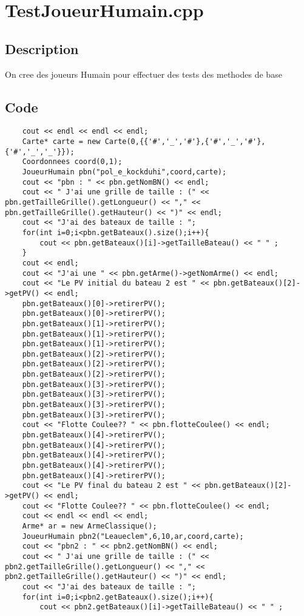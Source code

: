     \section{TestJoueurHumain.cpp}
        \subsection{Description}
            On cree des joueurs Humain pour effectuer des tests des methodes de base
        \subsection{Code}
\begin{lstlisting}
	cout << endl << endl << endl;
	Carte* carte = new Carte(0,{{'#','_','#'},{'#','_','#'},{'#','_','_'}});
	Coordonnees coord(0,1);
	JoueurHumain pbn("pol_e_kockduhi",coord,carte);
	cout << "pbn : " << pbn.getNomBN() << endl;
	cout << " J'ai une grille de taille : (" << pbn.getTailleGrille().getLongueur() << "," << pbn.getTailleGrille().getHauteur() << ")" << endl;
	cout << "J'ai des bateaux de taille : ";
	for(int i=0;i<pbn.getBateaux().size();i++){
		cout << pbn.getBateaux()[i]->getTailleBateau() << " " ;
	}
	cout << endl;
	cout << "J'ai une " << pbn.getArme()->getNomArme() << endl;
	cout << "Le PV initial du bateau 2 est " << pbn.getBateaux()[2]->getPV() << endl;
	pbn.getBateaux()[0]->retirerPV();
	pbn.getBateaux()[0]->retirerPV();
	pbn.getBateaux()[1]->retirerPV();
	pbn.getBateaux()[1]->retirerPV();
	pbn.getBateaux()[1]->retirerPV();
	pbn.getBateaux()[2]->retirerPV();
	pbn.getBateaux()[2]->retirerPV();
	pbn.getBateaux()[2]->retirerPV();
	pbn.getBateaux()[3]->retirerPV();
	pbn.getBateaux()[3]->retirerPV();
	pbn.getBateaux()[3]->retirerPV();
	pbn.getBateaux()[3]->retirerPV();
	cout << "Flotte Coulee?? " << pbn.flotteCoulee() << endl;
	pbn.getBateaux()[4]->retirerPV();
	pbn.getBateaux()[4]->retirerPV();
	pbn.getBateaux()[4]->retirerPV();
	pbn.getBateaux()[4]->retirerPV();
	pbn.getBateaux()[4]->retirerPV();
	cout << "Le PV final du bateau 2 est " << pbn.getBateaux()[2]->getPV() << endl;
	cout << "Flotte Coulee?? " << pbn.flotteCoulee() << endl;
	cout << endl << endl << endl;
	Arme* ar = new ArmeClassique();
	JoueurHumain pbn2("Leaueclem",6,10,ar,coord,carte);
	cout << "pbn2 : " << pbn2.getNomBN() << endl;
	cout << " J'ai une grille de taille : (" << pbn2.getTailleGrille().getLongueur() << "," << pbn2.getTailleGrille().getHauteur() << ")" << endl;
	cout << "J'ai des bateaux de taille : ";
	for(int i=0;i<pbn2.getBateaux().size();i++){
		cout << pbn2.getBateaux()[i]->getTailleBateau() << " " ;

\end{lstlisting}
